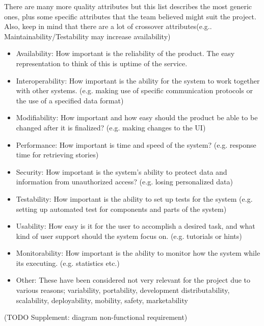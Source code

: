 There are many more quality attributes but this list describes the most generic ones, plus some specific attributes that the team believed might suit the project. Also, keep in mind that there are a lot of crossover attributes(e.g.. Maintainability/Testability may increase availability)\newline
\begin{itemize}
\item Availability: How important is the reliability of the product. The easy representation to think of this is uptime of the service.
\item Interoperability: How important is the ability for the system to work together with other systems. (e.g. making use of specific communication protocols or the use of a specified data format)
\item Modifiability: How important and how easy should the product be able to be changed after it is finalized? (e.g. making changes to the UI)
\item Performance: How important is time and speed of the system? (e.g. response time for retrieving stories)
\item Security: How important is the system’s ability to protect data and information from unauthorized access? (e.g. losing personalized data)
\item Testability: How important is the ability to set up tests for the system (e.g. setting up automated test for components and parts of the system)
\item Usability: How easy is it for the user to accomplish a desired task, and what kind of user support should the system focus on. (e.g. tutorials or hints)
\item Monitorability: How important is the ability to monitor how the system while its executing. (e.g. statistics etc.)
\item Other: These have been considered not very relevant for the project due to various reasons; variability, portability, development distributability, scalability, deployability, mobility, safety, marketability
\end{itemize}

(TODO Supplement: diagram non-functional requirement)

\cleardoublepage

